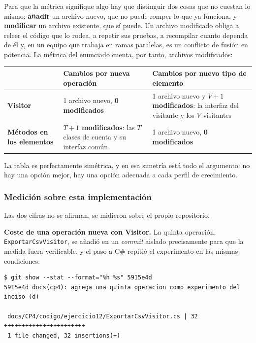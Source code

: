 Para que la métrica signifique algo hay que distinguir dos cosas que no cuestan lo mismo:
\textbf{añadir} un archivo nuevo, que no puede romper lo que ya funciona, y
\textbf{modificar} un archivo existente, que sí puede. Un archivo modificado obliga a releer
el código que lo rodea, a repetir sus pruebas, a recompilar cuanto dependa de él y, en un
equipo que trabaja en ramas paralelas, es un conflicto de fusión en potencia. La métrica del
enunciado cuenta, por tanto, archivos modificados:

\begin{table}[h!]
    \centering
    \small
    \begin{tabular}{p{3.9cm}p{5.1cm}p{5.1cm}}
        \toprule
        & \textbf{Cambios por nueva operación} & \textbf{Cambios por nuevo tipo de elemento} \\
        \midrule
        \textbf{Visitor}
            & 1 archivo nuevo, \textbf{0 modificados}
            & 1 archivo nuevo y \textbf{$V+1$ modificados}: la interfaz del visitante y los $V$
              visitantes \\
        \addlinespace
        \textbf{Métodos en los elementos}
            & \textbf{$T+1$ modificados}: las $T$ clases de cuenta y su interfaz común
            & 1 archivo nuevo, \textbf{0 modificados} \\
        \bottomrule
    \end{tabular}
\end{table}

La tabla es perfectamente simétrica, y en esa simetría está todo el argumento: no hay una
opción mejor, hay una opción adecuada a cada perfil de crecimiento.

\subsubsection*{Medición sobre esta implementación}

Las dos cifras no se afirman, se midieron sobre el propio repositorio.

\textbf{Coste de una operación nueva con Visitor.} La quinta operación,
\texttt{ExportarCsvVisitor}, se añadió en un \textit{commit} aislado precisamente para que la
medida fuera verificable, y el paso a C\# repitió el experimento en las mismas condiciones:

{\small
\begin{verbatim}
$ git show --stat --format="%h %s" 5915e4d
5915e4d docs(cp4): agrega una quinta operacion como experimento del inciso (d)

 docs/CP4/codigo/ejercicio12/ExportarCsvVisitor.cs | 32 +++++++++++++++++++++++
 1 file changed, 32 insertions(+)
\end{verbatim}
}

